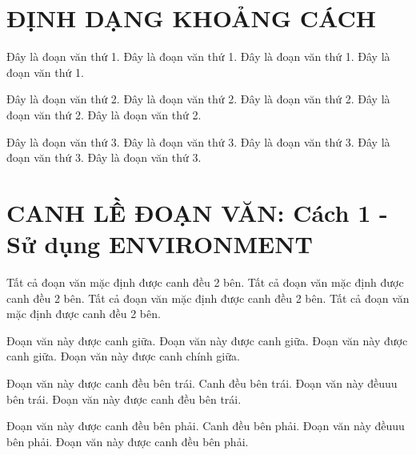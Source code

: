 \documentclass{article}
\begin{document}
\section{ĐỊNH DẠNG KHOẢNG CÁCH}
\setlength{\parskip}{0.5cm} 

\setlength{\parindent}{0.3cm} 

Đây là đoạn văn thứ 1. Đây là đoạn văn thứ 1. Đây là đoạn văn thứ 1. Đây là đoạn văn thứ 1.

Đây là đoạn văn thứ 2. Đây là đoạn văn thứ 2. Đây là đoạn văn thứ 2. Đây là đoạn văn thứ 2. Đây là đoạn văn thứ 2.

Đây là đoạn văn thứ 3. Đây là đoạn văn thứ 3. Đây là đoạn văn thứ 3. Đây là đoạn văn thứ 3. Đây là đoạn văn thứ 3.

\section{CANH LỀ ĐOẠN VĂN: Cách 1 - Sử dụng ENVIRONMENT}
\begin{minipage}{2in} %
Tất cả đoạn văn mặc định được canh đều 2 bên. Tất cả đoạn văn mặc định được canh đều 2 bên. Tất cả đoạn văn mặc định được canh đều 2 bên. Tất cả đoạn văn mặc định được canh đều 2 bên.
\end{minipage}

\begin{minipage}{2.3in} 
\begin{center}%
Đoạn văn này được canh giữa. Đoạn văn này được canh giữa. Đoạn văn này được canh giữa. Đoạn văn này được canh chính giữa.
\end{center}
\end{minipage}

\begin{minipage}{2.5in}
\begin{flushleft}  %
Đoạn văn này được canh đều bên trái. Canh đều bên trái. Đoạn văn này đềuuu bên trái. Đoạn văn này được canh đều bên trái.
\end{flushleft}
\end{minipage}

\begin{minipage}{2.7in}
\begin{flushright}  %
Đoạn văn này được canh đều bên phải. Canh đều bên phải. Đoạn văn này đềuuu bên phải. Đoạn văn này được canh đều bên phải.
\end{flushright}
\end{minipage}
\end{document}
